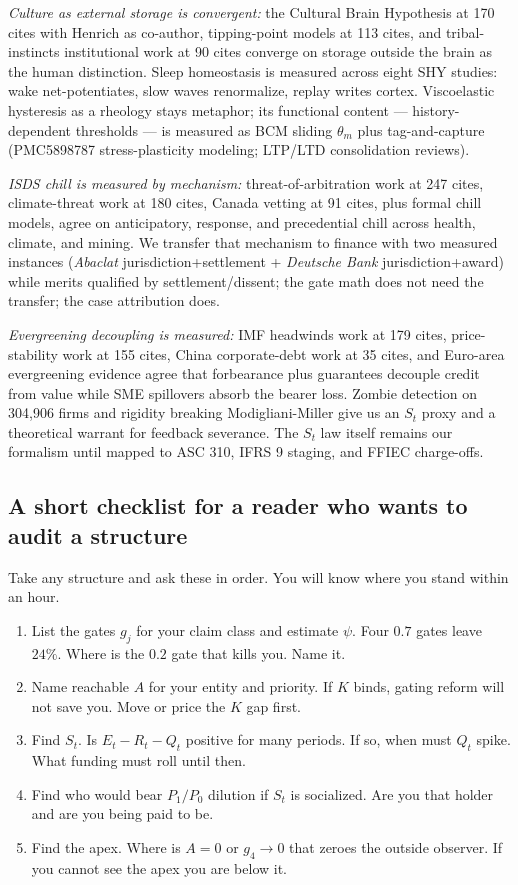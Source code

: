 \documentclass[11pt]{article}
\begin{document}
\textit{Culture as external storage is convergent:} the Cultural Brain Hypothesis at 170 cites with Henrich as co-author, tipping-point models at 113 cites, and tribal-instincts institutional work at 90 cites converge on storage outside the brain as the human distinction. Sleep homeostasis is measured across eight SHY studies: wake net-potentiates, slow waves renormalize, replay writes cortex. Viscoelastic hysteresis as a rheology stays metaphor; its functional content --- history-dependent thresholds --- is measured as BCM sliding $\theta_m$ plus tag-and-capture (PMC5898787 stress-plasticity modeling; LTP/LTD consolidation reviews).

\textit{ISDS chill is measured by mechanism:} threat-of-arbitration work at 247 cites, climate-threat work at 180 cites, Canada vetting at 91 cites, plus formal chill models, agree on anticipatory, response, and precedential chill across health, climate, and mining. We transfer that mechanism to finance with two measured instances (\textit{Abaclat} jurisdiction+settlement + \textit{Deutsche Bank} jurisdiction+award) while merits qualified by settlement/dissent; the gate math does not need the transfer; the case attribution does.

\textit{Evergreening decoupling is measured:} IMF headwinds work at 179 cites, price-stability work at 155 cites, China corporate-debt work at 35 cites, and Euro-area evergreening evidence agree that forbearance plus guarantees decouple credit from value while SME spillovers absorb the bearer loss. Zombie detection on 304,906 firms and rigidity breaking Modigliani-Miller give us an $S_t$ proxy and a theoretical warrant for feedback severance. The $S_t$ law itself remains our formalism until mapped to ASC 310, IFRS 9 staging, and FFIEC charge-offs.

\subsection{A short checklist for a reader who wants to audit a structure}

Take any structure and ask these in order. You will know where you stand within an hour.

\begin{enumerate}
\item List the gates $g_j$ for your claim class and estimate $\psi$. Four $0.7$ gates leave $24\%$. Where is the $0.2$ gate that kills you. Name it.
\item Name reachable $A$ for your entity and priority. If $K$ binds, gating reform will not save you. Move or price the $K$ gap first.
\item Find $S_t$. Is $E_t-R_t-Q_t$ positive for many periods. If so, when must $Q_t$ spike. What funding must roll until then.
\item Find who would bear $P_1/P_0$ dilution if $S_t$ is socialized. Are you that holder and are you being paid to be.
\item Find the apex. Where is $A=0$ or $g_4\to0$ that zeroes the outside observer. If you cannot see the apex you are below it.
\end{enumerate}
\end{document}
